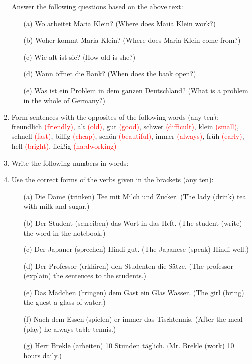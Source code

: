 \documentclass{article}
\begin{document}
\begin{enumerate}
    Answer the following questions based on the above text:
    \begin{enumerate}
        \item[(a)] Wo arbeitet Maria Klein? (Where does Maria Klein work?)
        \item[(b)] Woher kommt Maria Klein? (Where does Maria Klein come from?)
        \item[(c)] Wie alt ist sie? (How old is she?)
        \item[(d)] Wann öffnet die Bank? (When does the bank open?)
        \item[(e)] Was ist ein Problem in dem ganzen Deutschland? (What is a problem in the whole of Germany?)
    \end{enumerate}
    \item Form sentences with the opposites of the following words (any ten): \\
    freundlich \textcolor{red}{(friendly)}, alt \textcolor{red}{(old)}, gut \textcolor{red}{(good)}, schwer \textcolor{red}{(difficult)}, klein \textcolor{red}{(small)}, schnell \textcolor{red}{(fast)}, billig \textcolor{red}{(cheap)}, schön \textcolor{red}{(beautiful)}, immer \textcolor{red}{(always)}, früh \textcolor{red}{(early)}, hell \textcolor{red}{(bright)}, fleißig \textcolor{red}{(hardworking)}
    \item Write the following numbers in words:
    \item Use the correct forms of the verbs given in the brackets (any ten):
    \begin{enumerate}
        \item[(a)] Die Dame (trinken) Tee mit Milch und Zucker. (The lady (drink) tea with milk and sugar.)
        \item[(b)] Der Student (schreiben) das Wort in das Heft. (The student (write) the word in the notebook.)
        \item[(c)] Der Japaner (sprechen) Hindi gut. (The Japanese (speak) Hindi well.)
        \item[(d)] Der Professor (erklären) den Studenten die Sätze. (The professor (explain) the sentences to the students.)
        \item[(e)] Das Mädchen (bringen) dem Gast ein Glas Wasser. (The girl (bring) the guest a glass of water.)
        \item[(f)] Nach dem Essen (spielen) er immer das Tischtennis. (After the meal (play) he always table tennis.)
        \item[(g)] Herr Brekle (arbeiten) 10 Stunden täglich. (Mr. Brekle (work) 10 hours daily.)

\end{enumerate}
\end{enumerate}
\end{document}
